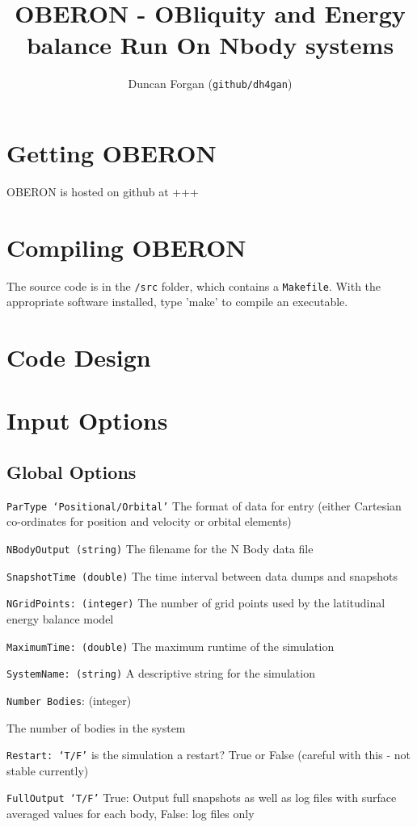 \documentclass[usenatbib,11pt]{article}
\begin{document}
\title{OBERON - OBliquity and Energy balance Run On Nbody systems}
\author{Duncan Forgan (\texttt{github/dh4gan})}
\maketitle

\newpage
\tableofcontents
\newpage

\section{Getting OBERON}

\noindent OBERON is hosted on github at +++

\section{Compiling OBERON}

\noindent The source code is in the \texttt{/src} folder, which contains a \texttt{Makefile}.  With the appropriate software installed, type 'make' to compile an executable.


\section{Code Design}

\section{Input Options}


\subsection{Global Options}

\begin{itemize}
\item{\texttt{ParType `Positional/Orbital'}} The format of data for entry (either Cartesian co-ordinates for position and velocity or orbital elements)
\item{\texttt{NBodyOutput (string)}} The filename for the N Body data file
\item{\texttt{SnapshotTime (double)}} The time interval between data dumps and snapshots
\item{\texttt{NGridPoints: (integer)}} The number of grid points used by the latitudinal energy balance model
\item{\texttt{MaximumTime: (double)}} The maximum runtime of the simulation
\item{\texttt{SystemName: (string)} A descriptive string for the simulation
\item{\texttt{Number Bodies}: (integer)}} The number of bodies in the system
\item{\texttt{Restart: `T/F'}} is the simulation a restart? True or False (careful with this - not stable currently)
\item{\texttt{FullOutput `T/F'}} True: Output full snapshots as well as log files with surface averaged values for each body, False: log files only
\end{itemize}
\end{document}
